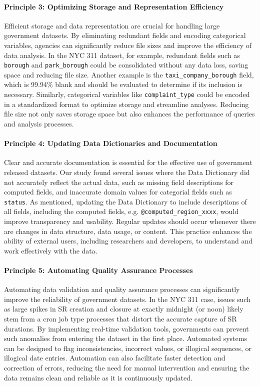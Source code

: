 \documentclass[linenumber]{jdsart}
\begin{document}
\paragraph{Principle 3: Optimizing Storage and Representation Efficiency}
Efficient storage and data representation are crucial for handling 
large government datasets. By eliminating redundant fields and 
encoding categorical variables, agencies can significantly reduce 
file sizes and improve the efficiency of data analysis. In the NYC 
311 dataset, for example, redundant fields such as \texttt{borough} 
and \texttt{park\_borough} could be consolidated without any data 
loss, saving space and reducing file size. Another 
example is the \texttt{taxi\_company\_borough} field, which is 99.94\% 
blank and should be evaluated to determine if its inclusion is 
necessary. Similarly, categorical variables like \texttt{complaint\_type} 
could be encoded in a standardized format to optimize storage and 
streamline analyses. Reducing file size not only saves storage space 
but also enhances the performance of queries and analysis processes.

\paragraph{Principle 4: Updating Data Dictionaries and Documentation}
Clear and accurate documentation is essential for the effective use 
of government released datasets. Our study found several 
issues where the Data Dictionary did not accurately reflect the 
actual data, such as missing field descriptions for computed fields, and 
inaccurate domain values for categorial fields such as \texttt{status}. 
As mentioned, updating the Data Dictionary to include descriptions of all fields, 
including the computed fields, e.g. \texttt{@computed\_region\_xxxx}, 
would improve transparency and usability. Regular updates should 
occur whenever there are changes in data structure, data usage, or 
content. This practice enhances the ability of external users, 
including researchers and developers, to understand and work 
effectively with the data.

\paragraph{Principle 5: Automating Quality Assurance Processes}
Automating data validation and quality assurance processes can 
significantly improve the reliability of government datasets. In the 
NYC 311 case, issues such as large spikes in SR creation and closure 
at exactly midnight (or noon) likely stem from a cron job type 
processes that distort the accurate capture of SR 
durations. By implementing real\mbox{-}time validation tools, governments 
can prevent such anomalies from entering the dataset in the first 
place. Automated 
systems can be designed to flag inconsistencies, incorrect values, 
or illogical sequences, or illogical date entries. 
Automation can also facilitate faster detection and correction of 
errors, reducing the need for manual intervention and ensuring 
the data remains clean and reliable as it is continuously updated.
\end{document}
